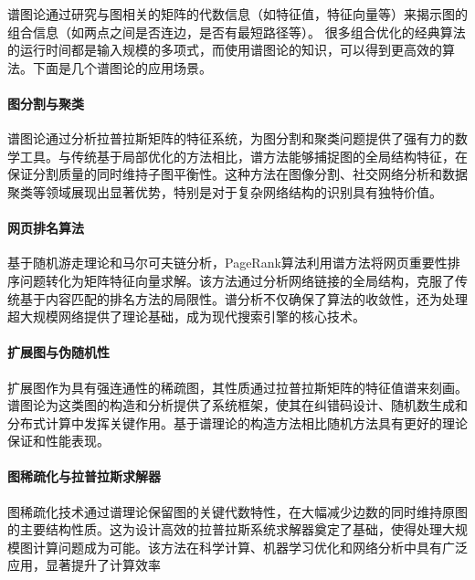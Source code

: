 \providecommand\numberthis{\addtocounter{equation}{1}\tag{\theequation}}

\providecommand{\R}{\mathbb{R}}
\providecommand{\Tr}{\mathrm{Tr}}
\providecommand{\sgn}{\mathrm{sgn}}
\providecommand{\NA}{\mathcal{A}(G)}
\providecommand{\NL}{\mathcal{L}(G)}
\providecommand{\vol}{\mathrm{vol}}
\providecommand{\qf}[2]{{#1}^{\top}{#2}{#1}}
\providecommand{\argmin}{\mathrm{argmin}}

\providecommand*\circled[1]{\tikz[baseline=(char.base)]{
            \node[shape=circle,draw,inner sep=2pt] (char) {#1};}}

谱图论通过研究与图相关的矩阵的代数信息（如特征值，特征向量等）来揭示图的组合信息（如两点之间是否连边，是否有最短路径等）。
很多组合优化的经典算法的运行时间都是输入规模的多项式，而使用谱图论的知识，可以得到更高效的算法。下面是几个谱图论的应用场景。

\paragraph{图分割与聚类}
谱图论通过分析拉普拉斯矩阵的特征系统，为图分割和聚类问题提供了强有力的数学工具。与传统基于局部优化的方法相比，谱方法能够捕捉图的全局结构特征，在保证分割质量的同时维持子图平衡性。这种方法在图像分割、社交网络分析和数据聚类等领域展现出显著优势，特别是对于复杂网络结构的识别具有独特价值。

\paragraph{网页排名算法}
基于随机游走理论和马尔可夫链分析，PageRank算法利用谱方法将网页重要性排序问题转化为矩阵特征向量求解。该方法通过分析网络链接的全局结构，克服了传统基于内容匹配的排名方法的局限性。谱分析不仅确保了算法的收敛性，还为处理超大规模网络提供了理论基础，成为现代搜索引擎的核心技术。

\paragraph{扩展图与伪随机性}
扩展图作为具有强连通性的稀疏图，其性质通过拉普拉斯矩阵的特征值谱来刻画。谱图论为这类图的构造和分析提供了系统框架，使其在纠错码设计、随机数生成和分布式计算中发挥关键作用。基于谱理论的构造方法相比随机方法具有更好的理论保证和性能表现。

\paragraph{图稀疏化与拉普拉斯求解器}
图稀疏化技术通过谱理论保留图的关键代数特性，在大幅减少边数的同时维持原图的主要结构性质。这为设计高效的拉普拉斯系统求解器奠定了基础，使得处理大规模图计算问题成为可能。该方法在科学计算、机器学习优化和网络分析中具有广泛应用，显著提升了计算效率

